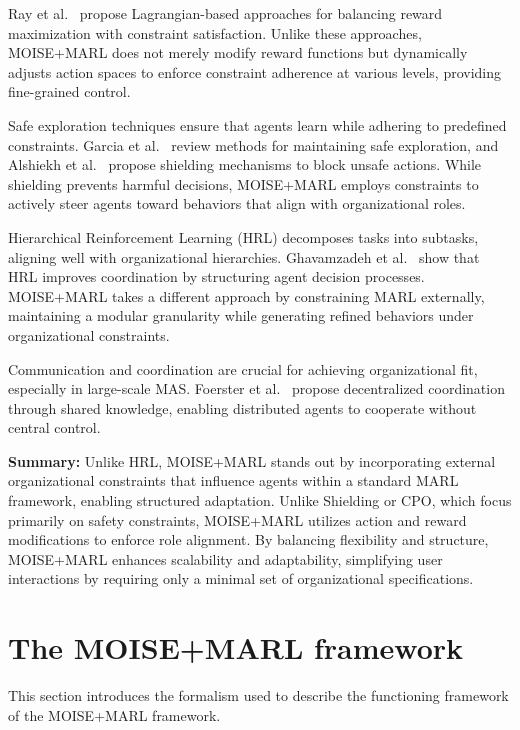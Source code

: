 \documentclass[sigconf,anonymous]{aamas}
\begin{document}
Ray et al.~\cite{ray2019benchmarking} propose Lagrangian-based approaches for balancing reward maximization with constraint satisfaction. Unlike these approaches, MOISE+MARL does not merely modify reward functions but dynamically adjusts action spaces to enforce constraint adherence at various levels, providing fine-grained control.

Safe exploration techniques ensure that agents learn while adhering to predefined constraints. Garcia et al.~\cite{garcia2015comprehensive} review methods for maintaining safe exploration, and Alshiekh et al.~\cite{alshiekh2018safe} propose shielding mechanisms to block unsafe actions. While shielding prevents harmful decisions, MOISE+MARL employs constraints to actively steer agents toward behaviors that align with organizational roles.

Hierarchical Reinforcement Learning (HRL) decomposes tasks into subtasks, aligning well with organizational hierarchies. Ghavamzadeh et al.~\cite{ghavamzadeh2006hrl} show that HRL improves coordination by structuring agent decision processes. MOISE+MARL takes a different approach by constraining MARL externally, maintaining a modular granularity while generating refined behaviors under organizational constraints.

Communication and coordination are crucial for achieving organizational fit, especially in large-scale MAS. Foerster et al.~\cite{foerster2018communication} propose decentralized coordination through shared knowledge, enabling distributed agents to cooperate without central control.

\medskip

\noindent \textbf{Summary:} Unlike HRL, MOISE+MARL stands out by incorporating external organizational constraints that influence agents within a standard MARL framework, enabling structured adaptation. Unlike Shielding or CPO, which focus primarily on safety constraints, MOISE+MARL utilizes action and reward modifications to enforce role alignment. By balancing flexibility and structure, MOISE+MARL enhances scalability and adaptability, simplifying user interactions by requiring only a minimal set of organizational specifications.




\section{The MOISE+MARL framework}
\label{sec:moise_marl_framework}

This section introduces the formalism used to describe the functioning framework of the MOISE+MARL framework.
\end{document}
